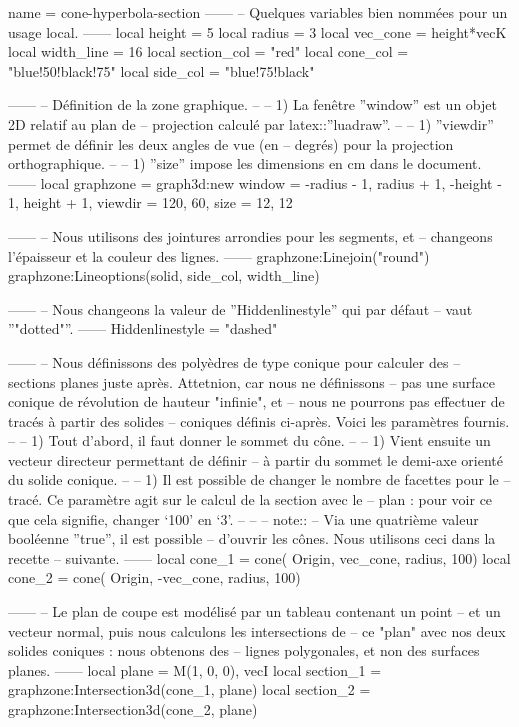 \documentclass[varwidth, border = 3pt]{standalone}
\begin{document}
\begin{luadraw}{name = cone-hyperbola-section}
------
-- Quelques variables bien nommées pour un usage local.
------
    local height      =  5
    local radius      =  3
    local vec_cone    = height*vecK
    local width_line  =  16
    local section_col = "red"
    local cone_col    = "blue!50!black!75"
    local side_col    = "blue!75!black"

------
-- Définition de la zone graphique.
--
--     1) La fenêtre ''window'' est un objet 2D relatif au plan de
--     projection calculé par latex::''luadraw''.
--
--     1) ''viewdir'' permet de définir les deux angles de vue (en
--     degrés) pour la projection orthographique.
--
--     1) ''size'' impose les dimensions en cm dans le document.
------
    local graphzone = graph3d:new{
        window  = {-radius - 1, radius + 1, -height - 1, height + 1},
        viewdir = {120, 60},
        size    = {12, 12}
    }

------
-- Nous utilisons des jointures arrondies pour les segments, et
-- changeons l'épaisseur et la couleur des lignes.
------
    graphzone:Linejoin("round")
    graphzone:Lineoptions(solid, side_col, width_line)

------
-- Nous changeons la valeur de ''Hiddenlinestyle'' qui par défaut
-- vaut ''"dotted"''.
------
    Hiddenlinestyle = "dashed"

------
-- Nous définissons des polyèdres de type conique pour calculer des
-- sections planes juste après. Attetnion, car nous ne définissons
-- pas une surface conique de révolution de hauteur "infinie", et
-- nous ne pourrons pas effectuer de tracés à partir des solides
-- coniques définis ci-après. Voici les paramètres fournis.
--
--     1) Tout d'abord, il faut donner le sommet du cône.
--
--     1) Vient ensuite un vecteur directeur permettant de définir
--     à partir du sommet le demi-axe orienté du solide conique.
--
--     1) Il est possible de changer le nombre de facettes pour le
--     tracé. Ce paramètre agit sur le calcul de la section avec le
--     plan : pour voir ce que cela signifie, changer `100' en `3'.
--
--
-- note::
--     Via une quatrième valeur booléenne ''true'', il est possible
--     d'ouvrir les cônes. Nous utilisons ceci dans la recette
--     suivante.
------
    local cone_1 = cone(
        Origin, vec_cone, radius,
        100)
    local cone_2 = cone(
        Origin,  -vec_cone, radius,
        100)

------
-- Le plan de coupe est modélisé par un tableau contenant un point
-- et un vecteur normal, puis nous calculons les intersections de
-- ce "plan" avec nos deux solides coniques : nous obtenons des
-- lignes polygonales, et non des surfaces planes.
------
    local plane     = {M(1, 0, 0), vecI}
    local section_1 = graphzone:Intersection3d(cone_1, plane)
    local section_2 = graphzone:Intersection3d(cone_2, plane)


\end{luadraw}
\end{document}

